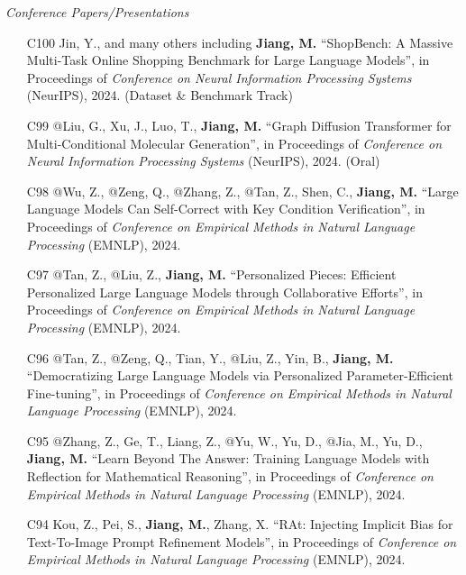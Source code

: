 \documentclass[10pt]{article}
\newenvironment{myindentpar}[1]%
{\begin{list}{}%
         {\setlength{\leftmargin}{#1}}%
         \item[]%
}
{\end{list}}
\newcounter{list}
\begin{document}
\begin{myindentpar}{0.00cm}

\hspace{-0.25cm}\textit{Conference Papers/Presentations}

\begin{enumerate}[leftmargin=.5cm]

\item[C100] Jin, Y., and many others including \textbf{Jiang, M.} ``ShopBench: A Massive Multi-Task Online Shopping Benchmark for Large Language Models'', in Proceedings of \textit{Conference on Neural Information Processing Systems} (NeurIPS), 2024. (Dataset \& Benchmark Track)

\item[C99] @Liu, G., Xu, J., Luo, T., \textbf{Jiang, M.} ``Graph Diffusion Transformer for Multi-Conditional Molecular Generation'', in Proceedings of \textit{Conference on Neural Information Processing Systems} (NeurIPS), 2024. (Oral)

\item[C98] @Wu, Z., @Zeng, Q., @Zhang, Z., @Tan, Z., Shen, C., \textbf{Jiang, M.} ``Large Language Models Can Self-Correct with Key Condition Verification'', in Proceedings of \textit{Conference on Empirical Methods in Natural Language Processing} (EMNLP), 2024.

\item[C97] @Tan, Z., @Liu, Z., \textbf{Jiang, M.} ``Personalized Pieces: Efficient Personalized Large Language Models through Collaborative Efforts'', in Proceedings of \textit{Conference on Empirical Methods in Natural Language Processing} (EMNLP), 2024.

\item[C96] @Tan, Z., @Zeng, Q., Tian, Y., @Liu, Z., Yin, B., \textbf{Jiang, M.} ``Democratizing Large Language Models via Personalized Parameter-Efficient Fine-tuning'', in Proceedings of \textit{Conference on Empirical Methods in Natural Language Processing} (EMNLP), 2024.

\item[C95] @Zhang, Z., Ge, T., Liang, Z., @Yu, W., Yu, D., @Jia, M., Yu, D., \textbf{Jiang, M.} ``Learn Beyond The Answer: Training Language Models with Reflection for Mathematical Reasoning'', in Proceedings of \textit{Conference on Empirical Methods in Natural Language Processing} (EMNLP), 2024.

\item[C94] Kou, Z., Pei, S., \textbf{Jiang, M.}, Zhang, X. ``RAt: Injecting Implicit Bias for Text-To-Image Prompt Refinement Models'', in Proceedings of \textit{Conference on Empirical Methods in Natural Language Processing} (EMNLP), 2024.


\end{enumerate}
\end{myindentpar}
\end{document}
